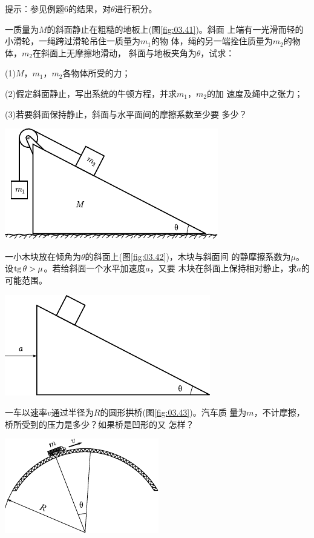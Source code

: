 \begin{exercises}
\lhbrak 提示：参见例题6的结果，对$ \theta $进行积分。\rhbrak

\exercise 一质量为$ M $的斜面静止在粗糙的地板上(图\ref{fig:03.41})。斜面
上端有一光滑而轻的小滑轮，一绳跨过滑轮吊住一质量为$ m_1 $的物
体，绳的另一端拴住质量为$ m_2 $的物体，$ m _ { 2 } $在斜面上无摩擦地滑动，
斜面与地板夹角为$ \theta $，试求：

(1)$ M $，$ m _ { 1 } $，$  m _ { 2 }  $各物体所受的力；

(2)假定斜面静止，写出系统的牛顿方程，并求$ m_1 $，$ m_2 $的加
速度及绳中之张力；

(3)若要斜面保持静止，斜面与水平面间的摩擦系数至少要
多少？
\begin{figurex}
	\centering
	\includegraphics{figure/fig03.41}
	\caption{}
	\label{fig:03.41}
\end{figurex}

\exercise 一小木块放在倾角为$ \theta $的斜面上(图\ref{fig:03.42})，木块与斜面间
的静摩擦系数为$ \mu $。设$  \operatorname{tg} \theta > \mu $。若给斜面一个水平加速度$ a $，又要
木块在斜面上保持相对静止，求$ a $的可能范围。
\begin{figurex}
	\centering
	\includegraphics{figure/fig03.42}
	\caption{}
	\label{fig:03.42}
\end{figurex}

\exercise 一车以速率$ v $通过半径为$ R $的圆形拱桥(图\ref{fig:03.43})。汽车质
量为$ m $，不计摩擦，桥所受到的压力是多少？如果桥是凹形的又
怎样？
\begin{figurex}
	\centering
	\includegraphics{figure/fig03.43}
	\caption{}
	\label{fig:03.43}
\end{figurex}
\end{exercises}